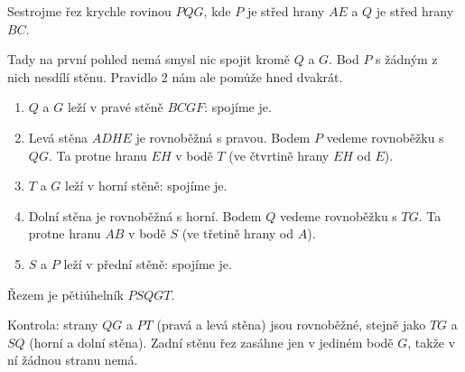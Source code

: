 \begin{example}
  Sestrojme řez krychle rovinou $PQG$, kde $P$ je střed hrany $AE$ a $Q$ je střed hrany $BC$.

  Tady na první pohled nemá smysl nic spojit kromě $Q$ a $G$. Bod $P$ s žádným z nich nesdílí stěnu. Pravidlo 2 nám ale pomůže hned dvakrát.
  \begin{enumerate}
    \item $Q$ a $G$ leží v pravé stěně $BCGF$: spojíme je.
    \item Levá stěna $ADHE$ je rovnoběžná s pravou. Bodem $P$ vedeme rovnoběžku s $QG$. Ta protne hranu $EH$ v bodě $T$ (ve čtvrtině hrany $EH$ od $E$).
    \item $T$ a $G$ leží v horní stěně: spojíme je.
    \item Dolní stěna je rovnoběžná s horní. Bodem $Q$ vedeme rovnoběžku s $TG$. Ta protne hranu $AB$ v bodě $S$ (ve třetině hrany od $A$).
    \item $S$ a $P$ leží v přední stěně: spojíme je.
  \end{enumerate}
  Řezem je pětiúhelník $PSQGT$.
  \begin{center}
  \end{center}
  Kontrola: strany $QG$ a $PT$ (pravá a levá stěna) jsou rovnoběžné, stejně jako $TG$ a $SQ$ (horní a dolní stěna). Zadní stěnu řez zasáhne jen v jediném bodě $G$, takže v ní žádnou stranu nemá.
\end{example}

